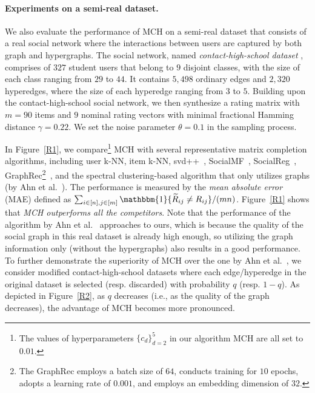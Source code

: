 \documentclass{article}
\begin{document}
\paragraph{Experiments on a semi-real dataset.} We also evaluate the performance of MCH on a semi-real dataset that consists of a real social network where the interactions between users are captured by both graph and  hypergraphs. The social network, named \emph{contact-high-school dataset} \citep{chodrow2021hypergraph, Mastrandrea-2015-contact}, comprises of $327$ student users that belong to $9$ disjoint classes, with the size of each class ranging from $29$ to $44$. It contains $5,498$ ordinary edges and $2,320$ hyperedges, where the size of each hyperedge ranging from $3$ to $5$.
Building upon the contact-high-school social network, we then synthesize a rating matrix with $m = 90$ items and $9$ nominal rating vectors with minimal fractional Hamming distance $\gamma = 0.22$. We set the noise parameter $\theta = 0.1$ in the sampling process. 

In Figure~\ref{R1}, we compare\footnote{The values of hyperparameters $\{c_d \}_{d=2}^5$ in our algorithm MCH are all set to $0.01$.} MCH with several representative matrix completion algorithms, including  user k-NN, item k-NN, svd++~\cite{koren2008factorization}, SocialMF~\cite{jamali2010matrix}, SocialReg~\cite{ma2011recommender}, GraphRec\footnote{The GraphRec employs a batch size of $64$, conducts training for $10$ epochs, adopts a learning rate of $0.001$, and employs an embedding dimension of $32$.}~\cite{fan2019graph}, and the spectral clustering-based algorithm that only utilizes graphs (by Ahn et al.~\cite{ahn2018binary}). The performance is measured by the \emph{mean absolute error} (MAE) defined as $\sum_{i \in [n], j \in [m]} \mathbbm{1}\{\widetilde{R}_{ij} \ne R_{ij} \}/(mn)$. Figure~\ref{R1} shows that \emph{MCH outperforms all the competitors}. Note that the performance of the algorithm by Ahn et al.~\cite{ahn2018binary} approaches to ours, which is because the quality of the social graph in this real dataset is already high enough, so utilizing the graph information only (without the hypergraphs) also results in a good performance. To further demonstrate the superiority of MCH over the one by Ahn et al.~\cite{ahn2018binary}, we consider  modified contact-high-school datasets where each edge/hyperedge in the original dataset is selected (resp. discarded) with probability $q$ (resp. $1-q$). As depicted in Figure~\ref{R2}, as  $q$ decreases (i.e., as the quality of the graph decreases), the advantage of MCH becomes more pronounced.
\end{document}
